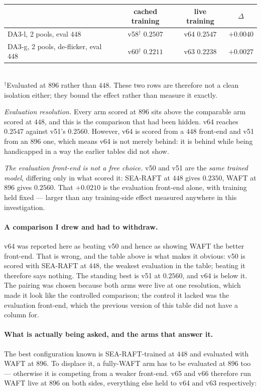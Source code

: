 \documentclass[11pt,a4paper]{article}
\begin{document}
\begin{center}\small
\begin{tabular}{lccc}
\toprule
& cached training & live training & $\Delta$ \\
\midrule
DA3-l, 2 pools, eval $448$              & v58$^{\dagger}$ $0.2507$ & v64 $0.2547$ & $+0.0040$ \\
DA3-g, 2 pools, de-flicker, eval $448$  & v60$^{\dagger}$ $0.2211$ & v63 $0.2238$ & $+0.0027$ \\
\bottomrule
\end{tabular}
\\[2pt]
{\footnotesize $^{\dagger}$Evaluated at $896$ rather than $448$. These two rows are therefore not a clean
isolation either; they bound the effect rather than measure it exactly.}
\end{center}

\emph{Evaluation resolution.} Every arm scored at $896$ sits above the comparable arm scored at
$448$, and this is the comparison that had been hidden. v64 reaches $0.2547$ against v51's
$0.2560$. However, v64 is scored from a $448$ front-end and v51 from an $896$ one, which means
v64 is not merely behind: it is behind while being handicapped in a way the earlier tables did not
show.

\emph{The evaluation front-end is not a free choice.} v50 and v51 are the \emph{same trained model},
differing only in what scored it: SEA-RAFT at $448$ gives $0.2350$, WAFT at $896$ gives $0.2560$.
That $+0.0210$ is the evaluation front-end alone, with training held fixed --- larger than any
training-side effect measured anywhere in this investigation.

\paragraph{A comparison I drew and had to withdraw.} v64 was reported here as beating v50 and hence
as showing WAFT the better front-end. That is wrong, and the table above is what makes it obvious:
v50 is scored with SEA-RAFT at $448$, the weakest evaluation in the table; beating it therefore
says nothing. The standing best is v51 at $0.2560$, and v64 is below it. The pairing was chosen because
both arms were live at one resolution, which made it look like the controlled comparison; the
control it lacked was the evaluation front-end, which the previous version of this table did not
have a column for.

\paragraph{What is actually being asked, and the arms that answer it.} The best configuration known
is SEA-RAFT-trained at $448$ and evaluated with WAFT at $896$. To displace it, a fully-WAFT arm has
to be evaluated at $896$ too --- otherwise it is competing from a weaker front-end. v65 and v66
therefore run WAFT live at $896$ on both sides, everything else held to v64 and v63 respectively:
\end{document}
